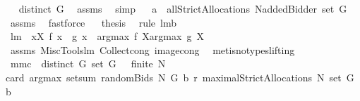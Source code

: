 \begin{isabellebody}
\isamarkupfalse%
\ \isamarkupfalse%
\ {\isachardoublequoteopen}distinct\ G{\isachardoublequoteclose}\ \isamarkupfalse%
\ assms{\isacharparenleft}{}{\isacharparenright}\ \isamarkupfalse%
\ simp\isanewline
{}\isamarkupfalse%
\ \isamarkupfalse%
\ {\isachardoublequoteopen}a\ {\isasymin}\ allStrictAllocations{\isacharprime}\ {\isacharparenleft}N{\isasymunion}{\isacharbraceleft}addedBidder{\isacharprime}{\isacharbraceright}{\isacharparenright}\ {\isacharparenleft}set\ G{\isacharparenright}{\isachardoublequoteclose}\ \isamarkupfalse%
\ assms{\isacharparenleft}{}{\isacharparenright}\ \isamarkupfalse%
\ fastforce\isanewline
{}\isamarkupfalse%
\ \isamarkupfalse%
\ {\isacharquery}thesis\ \isamarkupfalse%
\ {\isacharparenleft}rule\ lm{}{}b{\isacharparenright}\isanewline
{}\isamarkupfalse%
%
\endisatagproof
{\isafoldproof}%
%
\isadelimproof
\isanewline
%
\endisadelimproof
\isanewline
{}\isamarkupfalse%
\ lm{}{}{\isacharcolon}\ \ {\isachardoublequoteopen}{\isasymforall}x{\isasymin}X{\isachardot}\ f\ x\ {\isacharequal}\ g\ x{\isachardoublequoteclose}\ \ {\isachardoublequoteopen}argmax\ f\ X{\isacharequal}argmax\ g\ X{\isachardoublequoteclose}\ \isanewline
%
\isadelimproof
%
\endisadelimproof
%
\isatagproof
{}\isamarkupfalse%
\ assms\ MiscTools{\isachardot}lm{}{}\ Collect{\isacharunderscore}cong\ image{\isacharunderscore}cong\ \isanewline
{}\isamarkupfalse%
\ {\isacharparenleft}metis{\isacharparenleft}no{\isacharunderscore}types{\isacharcomma}lifting{\isacharparenright}{\isacharparenright}%
\endisatagproof
{\isafoldproof}%
%
\isadelimproof
\isanewline
%
\endisadelimproof
\isanewline
\isanewline
\isanewline
{}\isamarkupfalse%
\ mm{}{}c{\isacharcolon}\ \ {\isachardoublequoteopen}distinct\ G{\isachardoublequoteclose}\ {\isachardoublequoteopen}set\ G\ {\isasymnoteq}\ {\isacharbraceleft}{\isacharbraceright}{\isachardoublequoteclose}\ {\isachardoublequoteopen}finite\ N{\isachardoublequoteclose}\ \ \isanewline
{\isachardoublequoteopen}{}{\isacharequal}card\ {\isacharparenleft}argmax\ {\isacharparenleft}setsum\ {\isacharparenleft}randomBids\ N\ G\ b\ r{\isacharparenright}{\isacharparenright}\ {\isacharparenleft}maximalStrictAllocations{\isacharprime}\ N\ {\isacharparenleft}set\ G{\isacharparenright}\ b{\isacharparenright}{\isacharparenright}{\isachardoublequoteclose}\isanewline

\end{isabellebody}
